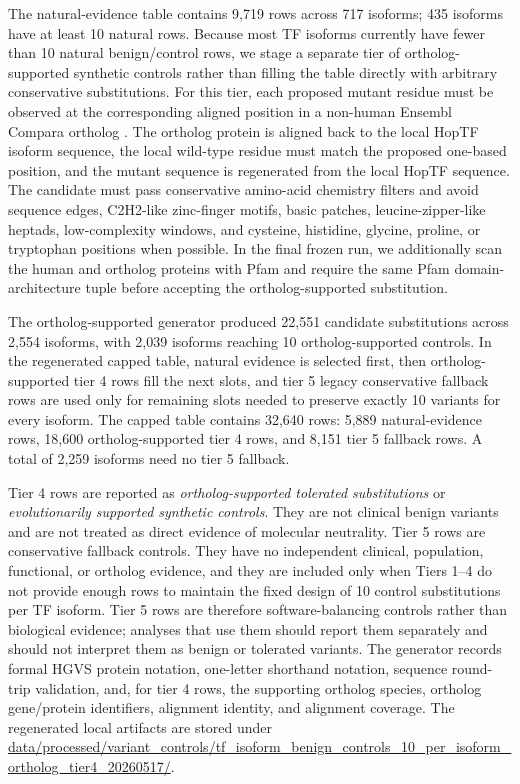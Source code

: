 \documentclass[11pt]{article}
\begin{document}
The natural-evidence table contains 9,719 rows across 717 isoforms; 435 isoforms have at least 10 natural rows. Because most TF isoforms currently have fewer than 10 natural benign/control rows, we stage a separate tier of ortholog-supported synthetic controls rather than filling the table directly with arbitrary conservative substitutions. For this tier, each proposed mutant residue must be observed at the corresponding aligned position in a non-human Ensembl Compara ortholog \citep{dyer2025ensembl}. The ortholog protein is aligned back to the local HopTF isoform sequence, the local wild-type residue must match the proposed one-based position, and the mutant sequence is regenerated from the local HopTF sequence. The candidate must pass conservative amino-acid chemistry filters and avoid sequence edges, C2H2-like zinc-finger motifs, basic patches, leucine-zipper-like heptads, low-complexity windows, and cysteine, histidine, glycine, proline, or tryptophan positions when possible. In the final frozen run, we additionally scan the human and ortholog proteins with Pfam \citep{mistry2021pfam} and require the same Pfam domain-architecture tuple before accepting the ortholog-supported substitution.

The ortholog-supported generator produced 22,551 candidate substitutions across 2,554 isoforms, with 2,039 isoforms reaching 10 ortholog-supported controls. In the regenerated capped table, natural evidence is selected first, then ortholog-supported tier 4 rows fill the next slots, and tier 5 legacy conservative fallback rows are used only for remaining slots needed to preserve exactly 10 variants for every isoform. The capped table contains 32,640 rows: 5,889 natural-evidence rows, 18,600 ortholog-supported tier 4 rows, and 8,151 tier 5 fallback rows. A total of 2,259 isoforms need no tier 5 fallback.

Tier 4 rows are reported as \emph{ortholog-supported tolerated substitutions} or \emph{evolutionarily supported synthetic controls}. They are not clinical benign variants and are not treated as direct evidence of molecular neutrality. Tier 5 rows are conservative fallback controls. They have no independent clinical, population, functional, or ortholog evidence, and they are included only when Tiers 1--4 do not provide enough rows to maintain the fixed design of 10 control substitutions per TF isoform. Tier 5 rows are therefore software-balancing controls rather than biological evidence; analyses that use them should report them separately and should not interpret them as benign or tolerated variants. The generator records formal HGVS protein notation, one-letter shorthand notation, sequence round-trip validation, and, for tier 4 rows, the supporting ortholog species, ortholog gene/protein identifiers, alignment identity, and alignment coverage. The regenerated local artifacts are stored under \url{data/processed/variant_controls/tf_isoform_benign_controls_10_per_isoform_ortholog_tier4_20260517/}.
\end{document}
